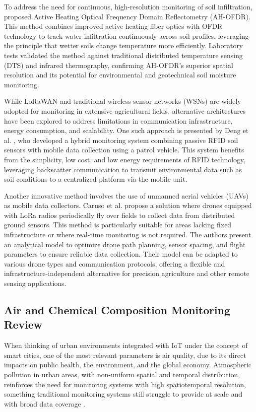 \documentclass[conference]{IEEEtran}
\begin{document}
To address the need for continuous, high-resolution monitoring of soil infiltration, \cite{sun_2024_highresolution} proposed Active Heating Optical Frequency Domain Reflectometry (AH-OFDR). This method combines improved active heating fiber optics with OFDR technology to track water infiltration continuously across soil profiles, leveraging the principle that wetter soils change temperature more efficiently. Laboratory tests validated the method against traditional distributed temperature sensing (DTS) and infrared thermography, confirming AH-OFDR’s superior spatial resolution and its potential for environmental and geotechnical soil moisture monitoring.

While LoRaWAN and traditional wireless sensor networks (WSNs) are widely adopted for monitoring in extensive agricultural fields, alternative architectures have been explored to address limitations in communication infrastructure, energy consumption, and scalability. One such approach is presented by Deng et al. \cite{deng_2020_novel}, who developed a hybrid monitoring system combining passive RFID soil sensors with mobile data collection using a patrol vehicle. This system benefits from the simplicity, low cost, and low energy requirements of RFID technology, leveraging backscatter communication to transmit environmental data such as soil conditions to a centralized platform via the mobile unit.

Another innovative method involves the use of unmanned aerial vehicles (UAVs) as mobile data collectors. Caruso et al. \cite{caruso_2021_drone} propose a solution where drones equipped with LoRa radios periodically fly over fields to collect data from distributed ground sensors. This method is particularly suitable for areas lacking fixed infrastructure or where real-time monitoring is not required. The authors present an analytical model to optimize drone path planning, sensor spacing, and flight parameters to ensure reliable data collection. Their model can be adapted to various drone types and communication protocols, offering a flexible and infrastructure-independent alternative for precision agriculture and other remote sensing applications.

\subsection{Air and Chemical Composition Monitoring Review}

When thinking of urban environments integrated with IoT under the concept of smart cities, one of the most relevant parameters is air quality, due to its direct impacts on public health, the environment, and the global economy. Atmospheric pollution in urban areas, with non-uniform spatial and temporal distribution, reinforces the need for monitoring systems with high spatiotemporal resolution, something traditional monitoring systems still struggle to provide at scale and with broad data coverage \cite{yi_2015_a}.
\end{document}
